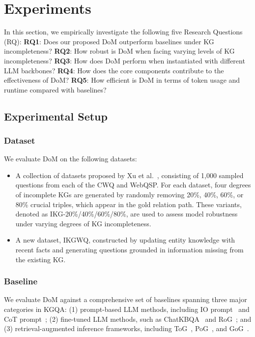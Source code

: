 % 
\section{Experiments}


In this section, we empirically investigate the following five Research Questions (RQ): \textbf{RQ1}: Does our proposed DoM outperform baselines under KG incompleteness? \textbf{RQ2}: How robust is DoM when facing varying levels of KG incompleteness? \textbf{RQ3}: How does DoM perform when instantiated with different LLM backbones? \textbf{RQ4}: How does the core components contribute to the effectiveness of DoM? \textbf{RQ5}: How efficient is DoM in terms of token usage and runtime compared with baselines?

\subsection{Experimental Setup}

\subsubsection{Dataset} 
We evaluate DoM on the following datasets:
\begin{itemize}
    \item A collection of datasets proposed by Xu et al.~\cite{xu2024generate}, consisting of 1,000 sampled questions from each of the CWQ and WebQSP. For each dataset, four degrees of incomplete KGs are generated by randomly removing 20\%, 40\%, 60\%, or 80\% crucial triples, which appear in the gold relation path. These variants, denoted as IKG-20\%/40\%/60\%/80\%, are used to assess model robustness under varying degrees of KG incompleteness.
    \item A new dataset, IKGWQ, constructed by updating entity knowledge with recent facts and generating questions grounded in information missing from the existing KG.
\end{itemize}



\subsubsection{Baseline}
We evaluate DoM against a comprehensive set of baselines spanning three major categories in KGQA: (1) prompt-based LLM methods, including IO prompt~\cite{brown2020language} and CoT prompt~\cite{wei2022chain}; (2) fine-tuned LLM methods, such as ChatKBQA~\cite{luo2024chatkbqa} and RoG~\cite{luo2024reasoning}; and (3) retrieval-augmented inference frameworks, including ToG~\cite{sun2023think}, PoG~\cite{tan2025paths}, and GoG~\cite{xu2024generate}.

